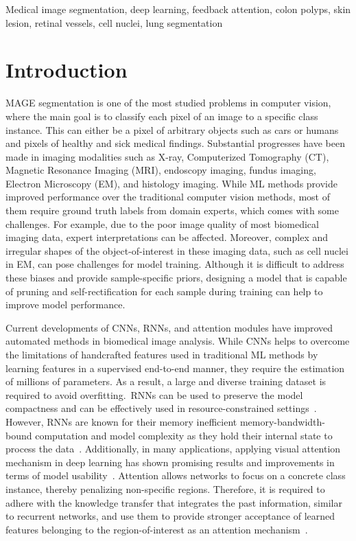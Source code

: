 \documentclass[journal]{IEEEtran}
\begin{document}
\begin{IEEEkeywords}
Medical image segmentation, deep learning, feedback attention, colon polyps, skin lesion, retinal vessels, cell nuclei, lung segmentation
\end{IEEEkeywords}

\IEEEpeerreviewmaketitle

\section{Introduction}
\label{sec:introduction}
MAGE segmentation is one of the most studied problems in computer vision, where the main goal is to classify each pixel of an image to a specific class instance. This can either be a pixel of arbitrary objects such as cars or humans and pixels of healthy and sick medical findings. Substantial progresses have been made in imaging modalities such as X-ray, Computerized Tomography (CT), Magnetic Resonance Imaging (MRI), endoscopy imaging, fundus imaging, Electron Microscopy (EM), and histology imaging. While \ac{ML} methods provide improved performance over the traditional computer vision methods, most of them require ground truth labels from domain experts, which comes with some challenges. For example, due to the poor image quality of most biomedical imaging data, expert interpretations can be affected. Moreover, complex and irregular shapes of the object-of-interest in these imaging data, such as cell nuclei in EM, can pose challenges for model training. Although it is difficult to address these biases and provide sample-specific priors, designing a model that is capable of pruning and self-rectification for each sample during training can help to improve model performance. 

Current developments of \acp{CNN}, \acp{RNN}, and attention modules have improved automated methods in biomedical image analysis. While \acp{CNN} helps to overcome the limitations of handcrafted features used in traditional \ac{ML} methods by learning features in a supervised end-to-end manner, they require the estimation of millions of parameters. As a result, a large and diverse training dataset is required to avoid overfitting.~\acp{RNN} can be used to preserve the model compactness and can be effectively used in resource-constrained settings~\cite{Wang:ICCV2019}. However, \acp{RNN} are known for their memory inefficient memory-bandwidth-bound computation and model complexity as they hold their internal state to process the data~\cite{bai2018empirical}. Additionally, in many applications, applying visual attention mechanism in deep learning has shown promising results and improvements in terms of model usability~\cite{xu2015show, Ashish:NIPS2017}. Attention allows networks to focus on a concrete class instance, thereby penalizing non-specific regions. Therefore, it is required to adhere with the knowledge transfer that integrates the past information, similar to recurrent networks, and use them to provide stronger acceptance of learned features belonging to the region-of-interest as an attention mechanism~\cite{Tilk2016BidirectionalRN,SCHLEMPER2019197}.
\end{document}
